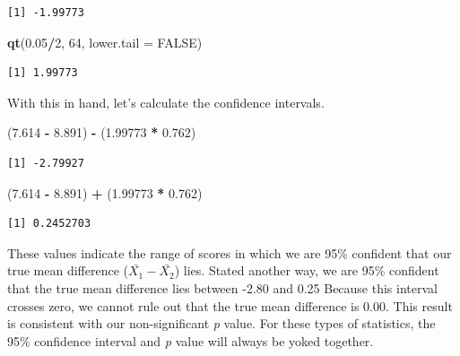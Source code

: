 \documentclass[
  11pt,
]{book}
\newenvironment{Shaded}{\begin{snugshade}}{\end{snugshade}}
\newcommand{\AttributeTok}[1]{\textcolor[rgb]{0.27,0.27,0.27}{#1}}
\newcommand{\ConstantTok}[1]{\textcolor[rgb]{0.37,0.37,0.37}{#1}}
\newcommand{\DecValTok}[1]{\textcolor[rgb]{0.06,0.06,0.06}{#1}}
\newcommand{\FloatTok}[1]{\textcolor[rgb]{0.06,0.06,0.06}{#1}}
\newcommand{\FunctionTok}[1]{\textcolor[rgb]{0.27,0.27,0.27}{\textbf{#1}}}
\newcommand{\NormalTok}[1]{#1}
\newcommand{\SpecialCharTok}[1]{\textcolor[rgb]{0.43,0.43,0.43}{\textbf{#1}}}
\begin{document}
\begin{verbatim}
[1] -1.99773
\end{verbatim}

\begin{Shaded}
\begin{Highlighting}[]
\FunctionTok{qt}\NormalTok{(}\FloatTok{0.05}\SpecialCharTok{/}\DecValTok{2}\NormalTok{, }\DecValTok{64}\NormalTok{, }\AttributeTok{lower.tail =} \ConstantTok{FALSE}\NormalTok{)}
\end{Highlighting}
\end{Shaded}

\begin{verbatim}
[1] 1.99773
\end{verbatim}

With this in hand, let's calculate the confidence intervals.

\begin{Shaded}
\begin{Highlighting}[]
\NormalTok{(}\FloatTok{7.614} \SpecialCharTok{{-}} \FloatTok{8.891}\NormalTok{) }\SpecialCharTok{{-}}\NormalTok{ (}\FloatTok{1.99773} \SpecialCharTok{*} \FloatTok{0.762}\NormalTok{)}
\end{Highlighting}
\end{Shaded}

\begin{verbatim}
[1] -2.79927
\end{verbatim}

\begin{Shaded}
\begin{Highlighting}[]
\NormalTok{(}\FloatTok{7.614} \SpecialCharTok{{-}} \FloatTok{8.891}\NormalTok{) }\SpecialCharTok{+}\NormalTok{ (}\FloatTok{1.99773} \SpecialCharTok{*} \FloatTok{0.762}\NormalTok{)}
\end{Highlighting}
\end{Shaded}

\begin{verbatim}
[1] 0.2452703
\end{verbatim}

These values indicate the range of scores in which we are 95\% confident that our true mean difference (\(\bar{X_{1}}-\bar{X_{2}}\)) lies. Stated another way, we are 95\% confident that the true mean difference lies between -2.80 and 0.25 Because this interval crosses zero, we cannot rule out that the true mean difference is 0.00. This result is consistent with our non-significant \emph{p} value. For these types of statistics, the 95\% confidence interval and \emph{p} value will always be yoked together.
\end{document}
